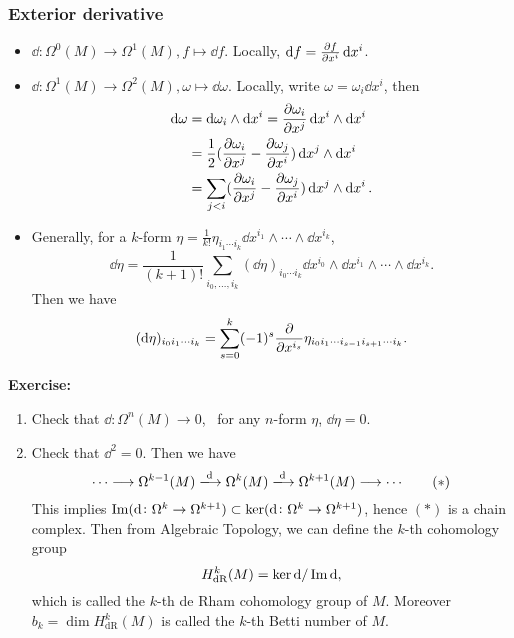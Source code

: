 \subsubsection{Exterior derivative}
\begin{itemize}
\item \(\dd\colon \Omega^0(M)\longrightarrow \Omega^1(M),f\longmapsto\dd{f}\).
    Locally, \(\dd{f}=\pdv{f}{x^i}\dd{x^i}\).
\item \(\dd\colon \Omega^1(M)\to \Omega^2(M),\omega\mapsto \dd{\omega}\).
    Locally, write \(\omega=\omega_i\dd{x^i}\), then
    \begin{align*}
        \dd{\omega}&=\dd{\omega_i}\wedge \dd{x^i}=\pdv{\omega_i}{x^j}\dd{x^i}
        \wedge \dd{x^i} \\
        &=\frac{1}{2}(\pdv{\omega_i}{x^j}-\pdv{\omega_j}{x^i})\dd{x^j}\wedge\dd{x^i}\\
        &=\sum_{j<i}(\pdv{\omega_i}{x^j}-\pdv{\omega_j}{x^i})\dd{x^j}\wedge\dd{x^i}
    .\end{align*}
\item Generally, for a \(k\)-form \(\eta=\frac{1}{k!}\eta_{i_1\cdots i_k}\dd{x^{i_1}}
    \wedge \cdots \wedge \dd{x^{i_k}}\), \[
        \dd{\eta}=\frac{1}{(k+1)!}\sum_{i_0,\ldots,i_k}(\dd{\eta})_{i_0\cdots i_k}
        \dd{x^{i_0}}\wedge \dd{x^{i_1}}\wedge \cdots \wedge \dd{x^{i_k}}
    .\] Then we have \[
        (\dd{\eta})_{i_0i_1\cdots i_k}=\sum_{s=0}^k(-1)^s
        \pdv{x^{i_s}}\eta_{i_0i_1\cdots i_{s-1}i_{s+1}\cdots i_k}
    .\] 
\end{itemize}

\noindent\textbf{Exercise:}
\begin{enumerate}[(1)]
\item Check that \(\dd\colon \Omega^n(M)\to 0\), \ie\ for any \(n\)-form \(\eta\),
    \(\dd{\eta}=0\).
\item Check that \(\dd^2=0\). Then we have \[
    \cdots\longrightarrow\Omega^{k-1}(M)\xrr{\dd}\Omega^k(M)
    \xrr{\dd}\Omega^{k+1}(M)\longrightarrow\cdots\qquad (*)
    \] This implies \(\operatorname{Im}(\dd\colon \Omega^k\to \Omega^{k+1})\subset \ker(\dd\colon
    \Omega^k\to \Omega^{k+1})\), hence \((*)\) is a chain complex. Then from Algebraic
    Topology, we can define the \(k\)-th cohomology group \[
        H_{\text{dR}}^k(M)=\ker \dd/\operatorname{Im} \dd
    ,\] which is called the \(k\)-th de Rham cohomology group of \(M\). Moreover
    \(b_k=\dim H_{\text{dR}}^k(M)\) is called the \(k\)-th Betti number of \(M\).
\end{enumerate}

